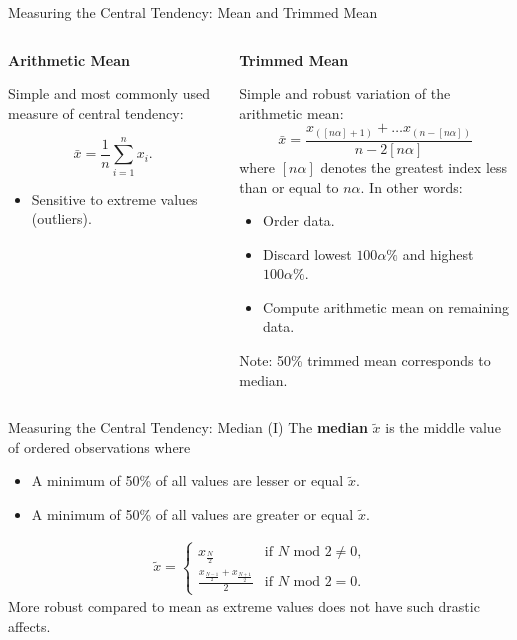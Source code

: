 \begin{frame}{Measuring the Central Tendency: Mean and Trimmed Mean}
	\begin{columns}
		\begin{column}{0.5\textwidth}
			\textbf{Arithmetic Mean}

			Simple and most commonly used measure of central tendency:

			\begin{equation*}
				\bar{x} = \frac{1}{n} \sum_{i=1}^{n} x_i.
			\end{equation*}

			\begin{itemize}
				\item Sensitive to extreme values (outliers).
			\end{itemize}
		\end{column}
		\begin{column}{0.5\textwidth}
			\textbf{Trimmed Mean}

			Simple and robust variation of the arithmetic mean:
			\begin{equation*}
				\bar{x} = \frac{x_{([n\alpha]+1)}+ \dots x_{(n-[n\alpha])}}{n-2[n\alpha]}
			\end{equation*}
			where $[n\alpha]$ denotes the greatest index less than or equal to $n\alpha$. In other words:

			\begin{itemize}
				\item Order data.
				\item Discard lowest $100\alpha\%$ and highest $100\alpha\%$.
				\item Compute arithmetic mean on remaining data.
			\end{itemize}


			Note: 50\% trimmed mean corresponds to median.
		\end{column}
	\end{columns}
\end{frame}

\begin{frame}{Measuring the Central Tendency: Median (I)}
	The \textbf{median} $\tilde{x}$ is the middle value of ordered observations where
	\begin{itemize}
		\item A minimum of 50\% of all values are lesser or equal $\tilde{x}$.
		\item A minimum of 50\% of all values are greater or equal $\tilde{x}$.
	\end{itemize}

	\begin{align*}
		\tilde{x} = %
		\begin{cases}
			x_{\frac{N}{2}}                               & \text{if $N$ mod $2 \neq 0$,} \\
			\frac{x_{\frac{N-1}{2}}+x_{\frac{N+1}{2}}}{2} & \text{if $N$ mod $2 = 0$.}
		\end{cases}
	\end{align*}
	More robust compared to mean as extreme values does not have such drastic affects.
\end{frame}


